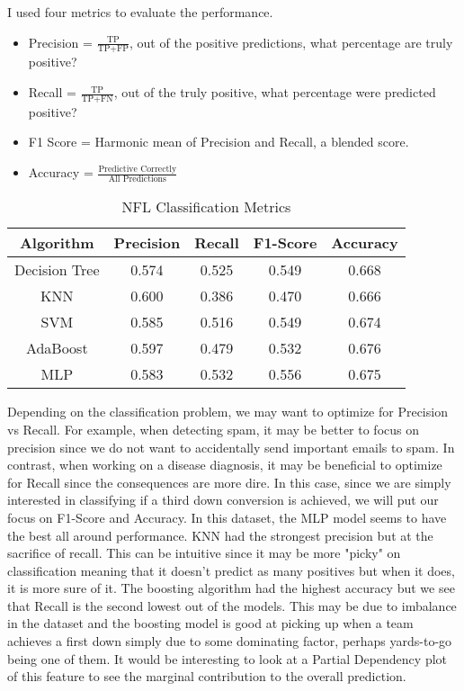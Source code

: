 \documentclass[12pt]{article}
\begin{document}
I used four metrics to evaluate the performance.

\begin{itemize}
  \item Precision = $\frac{\text{TP}}{\text{TP} + \text{FP}}$, out of the positive predictions, what percentage are truly positive?
  \item Recall = $\frac{\text{TP}}{\text{TP} + \text{FN}}$, out of the truly positive, what percentage were predicted positive?
  \item F1 Score = Harmonic mean of Precision and Recall, a blended score.
  \item Accuracy = $\frac{\text{Predictive Correctly}}{\text{All Predictions}}$
\end{itemize}

\begin{table}[H]
\caption{NFL Classification Metrics}
\centering
\begin{tabular}{|c|c|c|c|c|}
\hline
\textbf{Algorithm} & \textbf{Precision} & \textbf{Recall} & \textbf{F1-Score} & \textbf{Accuracy} \\ \hline
Decision Tree & 0.574 & 0.525 & 0.549 & 0.668 \\ \hline
KNN & 0.600 & 0.386 & 0.470 & 0.666 \\ \hline
SVM & 0.585 & 0.516 & 0.549 & 0.674 \\ \hline
AdaBoost & 0.597 & 0.479 & 0.532 & 0.676 \\ \hline
MLP & 0.583 & 0.532 & 0.556 & 0.675 \\ \hline
\end{tabular}
\end{table}

Depending on the classification problem, we may want to optimize for Precision vs Recall. For example, when detecting spam, it may be better to focus on precision since we do not want to accidentally send important emails to spam. In contrast, when working on a disease diagnosis, it may be beneficial to optimize for Recall since the consequences are more dire.  In this case, since we are simply interested in classifying if a third down conversion is achieved, we will put our focus on F1-Score and Accuracy. In this dataset, the MLP model seems to have the best all around performance. KNN had the strongest precision but at the sacrifice of recall. This can be intuitive since it may be more "picky" on classification meaning that it doesn't predict as many positives but when it does, it is more sure of it. The boosting algorithm had the highest accuracy but we see that Recall is the second lowest out of the models. This may be due to imbalance in the dataset and the boosting model is good at picking up when a team achieves a first down simply due to some dominating factor, perhaps yards-to-go being one of them. It would be interesting to look at a Partial Dependency plot of this feature to see the marginal contribution to the overall prediction.
\end{document}
